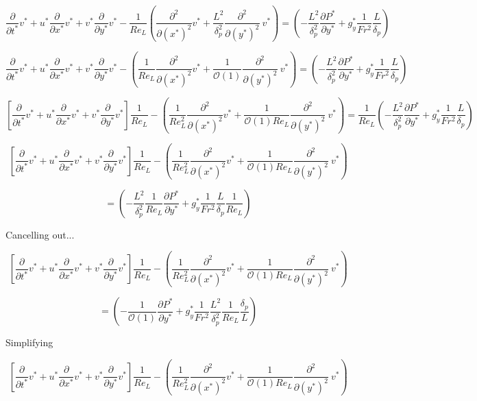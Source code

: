 \documentclass[11pt]{article}
\begin{document}
$$  \frac{\partial }{\partial t^*} v^* + u^*  \frac{\partial}{\partial x^*} v^* + v^* \frac{\partial}{\partial y^*} v^* -  \frac{1}{Re_L } ( \frac{\partial^2}{\partial (x^*)^2} v^* + \frac{L^2}{\delta_p^2} \frac{\partial^2}{\partial (y^*)^2} \ v^* ) =  (- \frac{L^2 }{\delta_p^2} \frac{\partial P^*}{\partial y^*} +g_y^*\frac{1}{Fr^2}\frac{L }{ \delta_p})$$


$$  \frac{\partial }{\partial t^*} v^* + u^*  \frac{\partial}{\partial x^*} v^* + v^* \frac{\partial}{\partial y^*} v^* -   ( \frac{1}{Re_L } \frac{\partial^2}{\partial (x^*)^2} v^* +  \frac{1}{\mathcal{O}(1) } \frac{\partial^2}{\partial (y^*)^2} \ v^* ) =  (- \frac{L^2 }{\delta_p^2} \frac{\partial P^*}{\partial y^*} +g_y^*\frac{1}{Fr^2}\frac{L }{ \delta_p})$$

$$  [\frac{\partial }{\partial t^*} v^* + u^*  \frac{\partial}{\partial x^*} v^* + v^* \frac{\partial}{\partial y^*} v^* ] \frac{1}{Re_L}-   ( \frac{1}{Re_L^2 } \frac{\partial^2}{\partial (x^*)^2} v^* +  \frac{1}{\mathcal{O}(1) Re_L} \frac{\partial^2}{\partial (y^*)^2} \ v^* ) =  \frac{1}{Re_L}(- \frac{L^2 }{\delta_p^2} \frac{\partial P^*}{\partial y^*} +g_y^*\frac{1}{Fr^2}\frac{L }{ \delta_p})$$

$$  [\frac{\partial }{\partial t^*} v^* + u^*  \frac{\partial}{\partial x^*} v^* + v^* \frac{\partial}{\partial y^*} v^* ] \frac{1}{Re_L}-   ( \frac{1}{Re_L^2 } \frac{\partial^2}{\partial (x^*)^2} v^* +  \frac{1}{\mathcal{O}(1) Re_L} \frac{\partial^2}{\partial (y^*)^2} \ v^* )$$

$$ =  (- \frac{L^2 }{\delta_p^2} \frac{1}{Re_L}\frac{\partial P^*}{\partial y^*} +g_y^*\frac{1}{Fr^2}\frac{L }{ \delta_p}\frac{1}{Re_L})$$

Cancelling out...

$$  [\frac{\partial }{\partial t^*} v^* + u^*  \frac{\partial}{\partial x^*} v^* + v^* \frac{\partial}{\partial y^*} v^* ] \frac{1}{Re_L}-   ( \frac{1}{Re_L^2 } \frac{\partial^2}{\partial (x^*)^2} v^* +  \frac{1}{\mathcal{O}(1) Re_L} \frac{\partial^2}{\partial (y^*)^2} \ v^* )$$

$$ =  (- \frac{1}{\mathcal{O}(1)}\frac{\partial P^*}{\partial y^*} +g_y^*\frac{1}{Fr^2}\frac{L^2 }{ \delta_p^2}\frac{1}{Re_L} \frac{\delta_p}{L})$$


Simplifying

$$  [\frac{\partial }{\partial t^*} v^* + u^*  \frac{\partial}{\partial x^*} v^* + v^* \frac{\partial}{\partial y^*} v^* ] \frac{1}{Re_L}-   ( \frac{1}{Re_L^2 } \frac{\partial^2}{\partial (x^*)^2} v^* +  \frac{1}{\mathcal{O}(1) Re_L} \frac{\partial^2}{\partial (y^*)^2} \ v^* )$$
\end{document}
